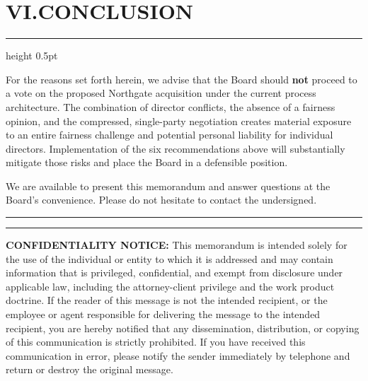 \section*{VI.\quad CONCLUSION}

{\color{rule}\hrule height 0.5pt}\vspace{6pt}

For the reasons set forth herein, we advise that the Board should \textbf{not} proceed to a vote on the proposed Northgate acquisition under the current process architecture.  The combination of director conflicts, the absence of a fairness opinion, and the compressed, single-party negotiation creates material exposure to an entire fairness challenge and potential personal liability for individual directors.  Implementation of the six recommendations above will substantially mitigate those risks and place the Board in a defensible position.

We are available to present this memorandum and answer questions at the Board's convenience.  Please do not hesitate to contact the undersigned.

\vspace{16pt}

\noindent\rule{\linewidth}{0.4pt}

\vspace{6pt}

\noindent
\begin{minipage}[t]{0.46\linewidth}
\end{minipage}\hspace{0.06\linewidth}%
\begin{minipage}[t]{0.46\linewidth}
\end{minipage}

\vspace{14pt}
\noindent\rule{\linewidth}{0.4pt}
\vspace{6pt}

{\footnotesize\color{subtle}
\textbf{CONFIDENTIALITY NOTICE:}  This memorandum is intended solely for the use of the individual or entity to which it is addressed and may contain information that is privileged, confidential, and exempt from disclosure under applicable law, including the attorney-client privilege and the work product doctrine.  If the reader of this message is not the intended recipient, or the employee or agent responsible for delivering the message to the intended recipient, you are hereby notified that any dissemination, distribution, or copying of this communication is strictly prohibited.  If you have received this communication in error, please notify the sender immediately by telephone and return or destroy the original message.
}
